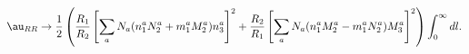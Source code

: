 \begin{equation}
\au_{RR}  \rightarrow 
\frac{1}{2}\left(\frac{R_1}{R_2}\left[\sum_{a}N_a(n^a_1N^a_2+m^a_1M^a_2)n^a_3\right]^2
+ \frac{R_2}{R_1}\left[\sum_{a}N_a(n^a_1M^a_2-m^a_1N^a_2)M^a_3\right]^2\right)\int_0^{\infty} 
dl. \label{FormulaRRtadpoleAn}
\end{equation}

